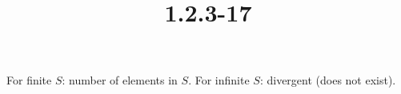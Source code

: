 \documentclass{article}
\title{1.2.3-17}
\begin{document}
\maketitle

For finite $S$: number of elements in $S$. For infinite $S$: divergent (does not exist).
\end{document}
